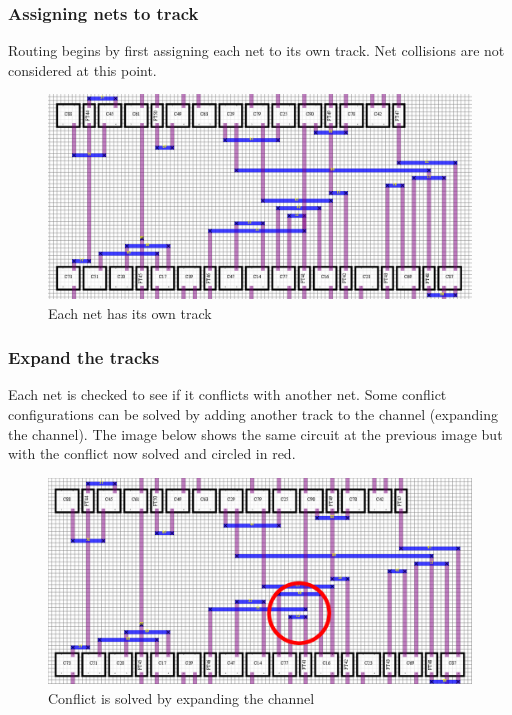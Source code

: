 \documentclass[10pt]{article}
\begin{document}
    \subsubsection{Assigning nets to track}

        Routing begins by first assigning each net to its own track. Net
        collisions are not considered at this point.

        \begin{figure}[H]
            \centering
            \includegraphics[width=\linewidth]{./route_0_crop.png}
            \caption{Each net has its own track}
        \end{figure}

    \subsubsection{Expand the tracks}

        Each net is checked to see if it conflicts with another net. Some
        conflict configurations can be solved by adding another track to the
        channel (expanding the channel). The image below shows the same circuit
        at the previous image but with the conflict now solved and circled in
        red.

        \begin{figure}[H]
            \centering
            \includegraphics[width=\linewidth]{./route_1_crop.png}
            \caption{Conflict is solved by expanding the channel}
        \end{figure}
\end{document}
